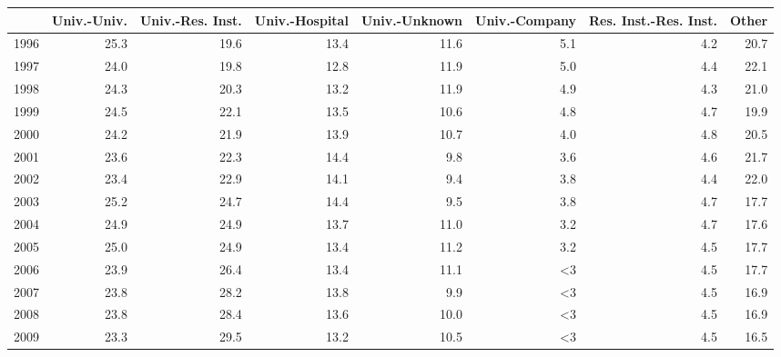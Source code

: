 \begin{tabular}{lrrrrrrr}
\toprule
{} &  Univ.-Univ. &  Univ.-Res. Inst. &  Univ.-Hospital &  Univ.-Unknown &  Univ.-Company &  Res. Inst.-Res. Inst. &  Other \\
\midrule
1996 &         25.3 &              19.6 &            13.4 &           11.6 &            5.1 &                    4.2 &   20.7 \\
1997 &         24.0 &              19.8 &            12.8 &           11.9 &            5.0 &                    4.4 &   22.1 \\
1998 &         24.3 &              20.3 &            13.2 &           11.9 &            4.9 &                    4.3 &   21.0 \\
1999 &         24.5 &              22.1 &            13.5 &           10.6 &            4.8 &                    4.7 &   19.9 \\
2000 &         24.2 &              21.9 &            13.9 &           10.7 &            4.0 &                    4.8 &   20.5 \\
2001 &         23.6 &              22.3 &            14.4 &            9.8 &            3.6 &                    4.6 &   21.7 \\
2002 &         23.4 &              22.9 &            14.1 &            9.4 &            3.8 &                    4.4 &   22.0 \\
2003 &         25.2 &              24.7 &            14.4 &            9.5 &            3.8 &                    4.7 &   17.7 \\
2004 &         24.9 &              24.9 &            13.7 &           11.0 &            3.2 &                    4.7 &   17.6 \\
2005 &         25.0 &              24.9 &            13.4 &           11.2 &            3.2 &                    4.5 &   17.7 \\
2006 &         23.9 &              26.4 &            13.4 &           11.1 &             <3 &                    4.5 &   17.7 \\
2007 &         23.8 &              28.2 &            13.8 &            9.9 &             <3 &                    4.5 &   16.9 \\
2008 &         23.8 &              28.4 &            13.6 &           10.0 &             <3 &                    4.5 &   16.9 \\
2009 &         23.3 &              29.5 &            13.2 &           10.5 &             <3 &                    4.5 &   16.5 \\

\end{tabular}
